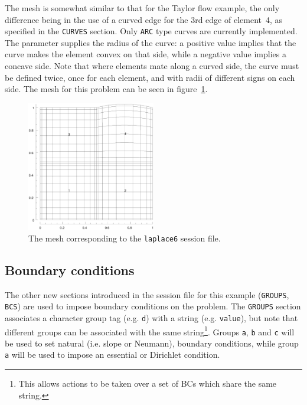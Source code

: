 \documentclass[11pt,a4paper]{report}
\begin{document}
The mesh is somewhat similar to that for the Taylor flow example, the
only difference being in the use of a curved edge for the 3rd edge of
element~4, as specified in the \texttt{CURVES} section.  Only
\texttt{ARC} type curves are currently implemented.  The parameter
supplies the radius of the curve: a positive value implies that the
curve makes the element convex on that side, while a negative value
implies a concave side.  Note that where elements mate along a curved
side, the curve must be defined twice, once for each element, and with
radii of different signs on each side.  The mesh for this problem can
be seen in figure~\ref{lapcurve}.
\begin{figure}
\begin{center}
\includegraphics[width=0.5\textwidth]{laplace6mesh.eps}
\end{center}
\caption{
\label{lapcurve}
  The mesh corresponding to the \texttt{laplace6} session file.
}
\end{figure}

\subsection{Boundary conditions}

The other new sections introduced in the session file for this example
(\texttt{GROUPS}, \texttt{BCS}) are used to impose boundary conditions
on the problem.  The \texttt{GROUPS} section associates a character
group tag (e.g. \verb+d+) with a string (e.g. \verb+value+), but note
that different groups can be associated with the same
string\footnote{This allows actions to be taken over a set of BCs
which share the same string.}.  Groups \verb+a+, \verb+b+ and \verb+c+
will be used to set natural (i.e. slope or Neumann), boundary
conditions, while group \verb+a+ will be used to impose an essential
or Dirichlet condition.
\end{document}
